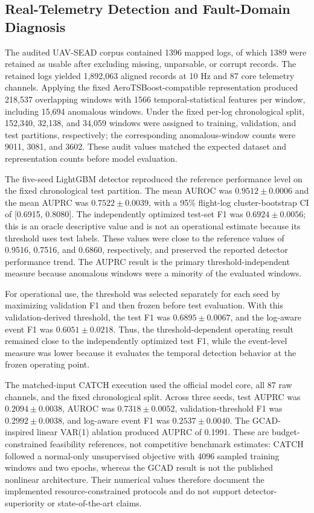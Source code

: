 \subsection{Real-Telemetry Detection and Fault-Domain Diagnosis}

The audited UAV-SEAD corpus contained 1396 mapped logs, of which 1389 were retained as usable after excluding missing, unparsable, or corrupt records. The retained logs yielded 1,892,063 aligned records at 10 Hz and 87 core telemetry channels. Applying the fixed AeroTSBoost-compatible representation produced 218,537 overlapping windows with 1566 temporal-statistical features per window, including 15,694 anomalous windows. Under the fixed per-log chronological split, 152,340, 32,138, and 34,059 windows were assigned to training, validation, and test partitions, respectively; the corresponding anomalous-window counts were 9011, 3081, and 3602. These audit values matched the expected dataset and representation counts before model evaluation.

The five-seed LightGBM detector reproduced the reference performance level on the fixed chronological test partition. The mean AUROC was $0.9512 \pm 0.0006$ and the mean AUPRC was $0.7522 \pm 0.0039$, with a 95\% flight-log cluster-bootstrap CI of [0.6915, 0.8080]. The independently optimized test-set F1 was $0.6924 \pm 0.0056$; this is an oracle descriptive value and is not an operational estimate because its threshold uses test labels. These values were close to the reference values of 0.9516, 0.7516, and 0.6860, respectively, and preserved the reported detector performance trend. The AUPRC result is the primary threshold-independent measure because anomalous windows were a minority of the evaluated windows.

For operational use, the threshold was selected separately for each seed by maximizing validation F1 and then frozen before test evaluation. With this validation-derived threshold, the test F1 was $0.6895 \pm 0.0067$, and the log-aware event F1 was $0.6051 \pm 0.0218$. Thus, the threshold-dependent operating result remained close to the independently optimized test F1, while the event-level measure was lower because it evaluates the temporal detection behavior at the frozen operating point.

The matched-input CATCH execution used the official model core, all 87 raw channels, and the fixed chronological split. Across three seeds, test AUPRC was $0.2094 \pm 0.0038$, AUROC was $0.7318 \pm 0.0052$, validation-threshold F1 was $0.2992 \pm 0.0038$, and log-aware event F1 was $0.2537 \pm 0.0040$. The GCAD-inspired linear VAR(1) ablation produced AUPRC of 0.1991. These are budget-constrained feasibility references, not competitive benchmark estimates: CATCH followed a normal-only unsupervised objective with 4096 sampled training windows and two epochs, whereas the GCAD result is not the published nonlinear architecture. Their numerical values therefore document the implemented resource-constrained protocols and do not support detector-superiority or state-of-the-art claims.

